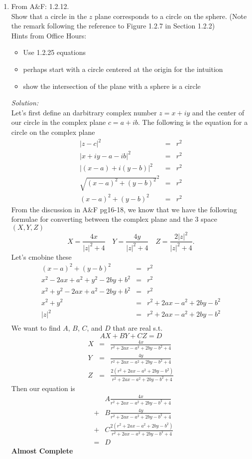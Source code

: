 \documentclass[10pt]{amsart}
\theoremstyle{nonumberplain}
\begin{document}
\mline
\begin{enumerate}[label={\bf {\arabic*}:}]
\item From A\&F: 1.2.12. \\
Show that a circle in the $z$ plane corresponds to a circle on the sphere.
(Note the remark following the reference to Figure 1.2.7 in Section 1.2.2)\\
Hints from Office Hours: \\
\begin{itemize}
\item Use 1.2.25 equations
\item perhaps start with a circle centered at the origin for the intuition
\item show the intersection of the plane with a sphere is a circle \\
\end{itemize}
\textit{Solution:} \\
Let's first define an darbitrary complex number $z = x + iy$ and the center of our circle in the complex plane $c = a + ib$.
The following is the equation for a circle on the complex plane
\begin{eqnarray*}
|z - c|^2 &=& r^2 \\
|x + iy - a - ib|^2 &=& r^2 \\
|(x - a) + i(y -b)|^2 &=& r^2 \\
\sqrt{(x - a)^2 + (y - b)^2}^2 &=& r^2 \\
(x - a)^2 + (y - b)^2 &=& r^2
\end{eqnarray*}
From the discussion in A\&F pg16-18, we know that we have the following formulae for converting between the complex plane and the 3 space $(X, Y, Z)$
$$X = \frac{4x}{|z|^2 + 4} \quad Y = \frac{4y}{|z|^2 + 4} \quad Z = \frac{2|z|^2}{|z|^2 + 4}.$$
Let's cmobine these
\begin{eqnarray*}
(x - a)^2 + (y - b)^2 &=& r^2 \\
x^2 -2ax + a^2 + y^2 -2by + b^2 &=& r^2 \\
x^2 + y^2 -2ax + a^2 -2by + b^2 &=& r^2 \\
x^2 + y^2 &=& r^2 +2ax - a^2 +2by - b^2 \\
|z|^2 &=& r^2 +2ax - a^2 +2by - b^2 \\
\end{eqnarray*}
We want to find $A$, $B$, $C$, and $D$ that are real s.t. $$AX + BY + CZ = D$$
\begin{eqnarray*}
X &=& \frac{4x}{r^2 +2ax - a^2 +2by - b^2 + 4} \\
Y &=& \frac{4y}{r^2 +2ax - a^2 +2by - b^2 + 4} \\
Z &=& \frac{2\left(r^2 +2ax - a^2 +2by - b^2\right)}{r^2 +2ax - a^2 +2by - b^2 + 4}
\end{eqnarray*}
Then our equation is
\begin{eqnarray*}
&& A\frac{4x}{r^2 +2ax - a^2 +2by - b^2 + 4}  \\
&+& B\frac{4y}{r^2 +2ax - a^2 +2by - b^2 + 4} \\
&+& C\frac{2\left(r^2 +2ax - a^2 +2by - b^2\right)}{r^2 +2ax - a^2 +2by - b^2 + 4} \\
&=& D
\end{eqnarray*}
\textbf{Almost Complete} \\


\end{enumerate}
\end{document}
